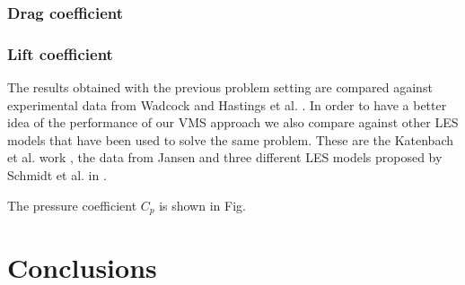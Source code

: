 \subsubsection{Drag coefficient}
\subsubsection{Lift coefficient}

The results obtained with the previous problem setting are compared against experimental data from Wadcock \cite{wadcock_investigation_1987} and Hastings et al. \cite{Hastings}. In order to have a better idea of the performance of our VMS approach we also compare against other LES models that have been used to solve the same problem. These are the Katenbach  et al. work \cite{kaltenbach_large-eddy_1995}, the data from Jansen \cite{jansen_stabilized_1999} and three different LES models proposed by Schmidt et al. in \cite{schmidt_assessment_????}.

The pressure coefficient $C_p$ is shown in Fig. 





\section{Conclusions}
\label{sec-C8_conclusions}